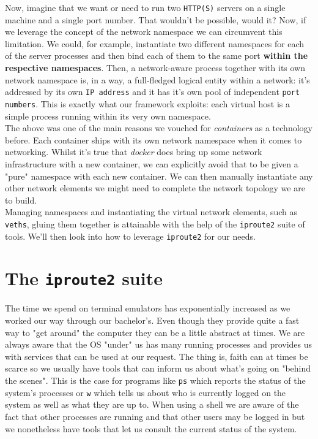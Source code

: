             Now, imagine that we want or need to run two \texttt{HTTP(S)} servers on a single machine and a single port number. That wouldn't be possible, would it? Now, if we leverage the concept of the network namespace we can circumvent this limitation. We could, for example, instantiate two different namespaces for each of the server processes and then bind each of them to the same port \textbf{within the respective namespaces}. Then, a network-aware process together with its own network namespace is, in a way, a full-fledged logical entity within a network: it's addressed by its own \texttt{IP address} and it has it's own pool of independent \texttt{port numbers}. This is exactly what our framework exploits: each virtual host is a simple process running within its very own namespace.\\

        The above was one of the main reasons we vouched for \textit{containers} as a technology before. Each container ships with its own network namespace when it comes to networking. Whilst it's true that \textit{docker} does bring up some network infrastructure with a new container, we can explicitly avoid that to be given a "pure" namespace with each new container. We can then manually instantiate any other network elements we might need to complete the network topology we are to build.\\

        Managing namespaces and instantiating the virtual network elements, such as \texttt{veths}, gluing them together is attainable with the help of the \texttt{iproute2} suite of tools. We'll then look into how to leverage \texttt{iproute2} for our needs.\\

    \section{The \texttt{iproute2} suite}
        The time we spend on terminal emulators has exponentially increased as we worked our way through our bachelor's. Even though they provide quite a fast way to "get around" the computer they can be a little abstract at times. We are always aware that the OS "under" us has many running processes and provides us with services that can be used at our request. The thing is, faith can at times be scarce so we usually have tools that can inform us about what's going on "behind the scenes". This is the case for programs like \texttt{ps} which reports the status of the system's processes or \texttt{w} which tells us about who is currently logged on the system as well as what they are up to. When using a shell we are aware of the fact that other processes are running and that other users may be logged in but we nonetheless have tools that let us consult the current status of the system.\\

